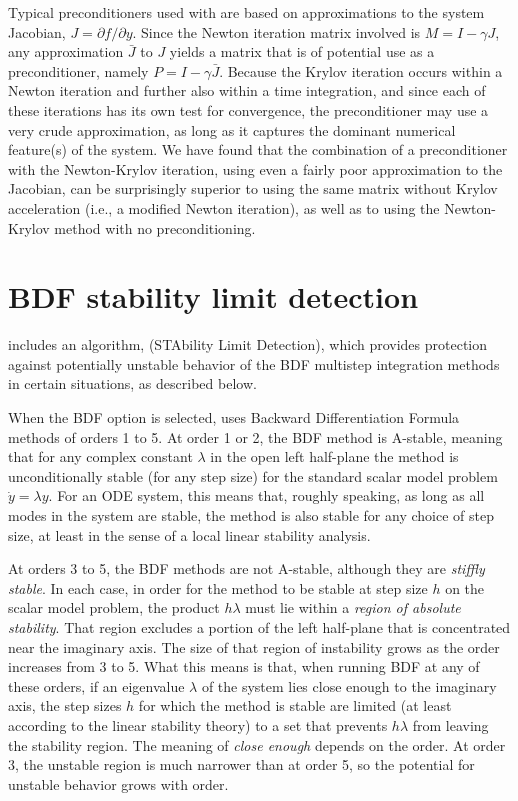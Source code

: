Typical preconditioners used with {\cvodes} are based on approximations
to the system Jacobian, $J = \partial f / \partial y$.  Since the
Newton iteration matrix involved is $M = I - \gamma J$, any
approximation $\bar{J}$ to $J$ yields a matrix that is of potential
use as a preconditioner, namely $P = I - \gamma \bar{J}$.
Because the Krylov iteration occurs within a Newton iteration and further
also within a time integration, and since each of these iterations has
its own test for convergence, the preconditioner may use a very crude
approximation, as long as it captures the dominant numerical
feature(s) of the system.  We have found that the combination of a
preconditioner with the Newton-Krylov iteration, using even a fairly
poor approximation to the Jacobian, can be surprisingly superior to
using the same matrix without Krylov acceleration (i.e., a modified
Newton iteration), as well as to using the Newton-Krylov method with
no preconditioning.


\section{BDF stability limit detection}\label{s:bdf_stab}

{\cvodes} includes an algorithm, {\stald} (STAbility Limit Detection),
which provides protection against potentially unstable behavior of the 
BDF multistep integration methods in certain situations, as described below.

When the BDF option is selected, {\cvodes} uses Backward Differentiation 
Formula methods of orders 1 to 5.  At order 1 or 2, the BDF
method is A-stable, meaning that for any complex constant $\lambda$ in
the open left half-plane the method is unconditionally stable (for
any step size) for the standard scalar model problem ${\dot y} = \lambda y$.
For an ODE system, this means that, roughly speaking, as long as all
modes in the system are stable, the method is also stable for any
choice of step size, at least in the sense of a local linear stability
analysis.

At orders 3 to 5, the BDF methods are not A-stable, although they are
{\em stiffly stable}. In each case, in order for the method to be stable
at step size $h$ on the scalar model problem, the product $h\lambda$ must
lie within a {\em region of absolute stability}. 
That region excludes a portion of the left half-plane that is concentrated 
near the imaginary axis.  The size of that region of instability grows as the order
increases from 3 to 5.  What this means is that, when running BDF at
any of these orders, if an eigenvalue $\lambda$ of the system lies close
enough to the imaginary axis, the step sizes $h$ for which the method is
stable are limited (at least according to the linear stability theory)
to a set that prevents $h\lambda$ from leaving the stability region.
The meaning of {\em close enough} depends on the order.  
At order 3, the unstable region is much narrower than at order 5, 
so the potential for unstable behavior grows with order.

